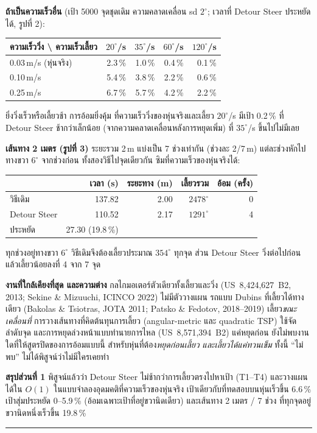 \documentclass[11pt,a4paper]{article}
\begin{document}
{\smallskip
\noindent\textbf{ถ้าเป็นความเร็วอื่น} (เป้า 5000 จุดชุดเดิม ความคลาดเคลื่อน sd $2^\circ$; เวลาที่ Detour Steer ประหยัดได้, รูปที่ 2):
\begin{center}
\begin{tabular}{lrrrr}
\toprule
ความเร็ววิ่ง \textbackslash{} ความเร็วเลี้ยว & $20^\circ$/s & $35^\circ$/s & $60^\circ$/s & $120^\circ$/s \\
\midrule
0.03\,m/s (หุ่นจริง) & 2.3\,\% & 1.0\,\% & 0.4\,\% & 0.1\,\% \\
0.10\,m/s            & 5.4\,\% & 3.8\,\% & 2.2\,\% & 0.6\,\% \\
0.25\,m/s            & 6.7\,\% & 5.7\,\% & 4.2\,\% & 2.2\,\% \\
\bottomrule
\end{tabular}
\end{center}
\noindent ยิ่งวิ่งเร็วหรือเลี้ยวช้า การอ้อมยิ่งคุ้ม ที่ความเร็ววิ่งของหุ่นจริงและเลี้ยว $20^\circ$/s
มีเป้า 0.2\,\% ที่ Detour Steer ช้ากว่าเล็กน้อย (จากความคลาดเคลื่อนหลังการหยุดเพิ่ม)
ที่ $35^\circ$/s ขึ้นไปไม่มีเลย

\smallskip
\noindent\textbf{เส้นทาง 2 เมตร (รูปที่ 3)} ระยะรวม 2\,m แบ่งเป็น 7 ช่วงเท่ากัน (ช่วงละ 2/7\,m)
แต่ละช่วงหักไปทางขวา $6^\circ$ จากช่วงก่อน ทั้งสองวิธีไปจุดเดียวกัน
ซิมที่ความเร็วของหุ่นจริงได้:
\begin{center}
\begin{tabular}{lrrrr}
\toprule
 & เวลา (s) & ระยะทาง (m) & เลี้ยวรวม & อ้อม (ครั้ง) \\
\midrule
วิธีเดิม       & 137.82 & 2.00 & $2478^\circ$ & 0 \\
Detour Steer & 110.52 & 2.17 & $1291^\circ$ & 4 \\
\midrule
ประหยัด       & 27.30 (19.8\,\%) & & & \\
\bottomrule
\end{tabular}
\end{center}
ทุกช่วงอยู่ทางขวา $6^\circ$ วิธีเดิมจึงต้องเลี้ยวประมาณ $354^\circ$ ทุกจุด ส่วน Detour Steer
วิ่งต่อไปก่อนแล้วเลี้ยวน้อยลงที่ 4 จาก 7 จุด

\medskip
\noindent\textbf{งานที่ใกล้เคียงที่สุด และความต่าง}
กลไกมอเตอร์ตัวเดียวทั้งเลี้ยวและวิ่ง (US~8,424,627~B2, 2013; Sekine \& Mizuuchi, ICINCO 2022) ไม่มีตัววางแผน
รถแบบ Dubins ที่เลี้ยวได้ทางเดียว (Bakolas \& Tsiotras, JOTA 2011; Patsko \& Fedotov, 2018--2019)
เลี้ยว\emph{ขณะเคลื่อนที่} การวางเส้นทางที่คิดต้นทุนการเลี้ยว (angular-metric และ quadratic TSP)
ใช้จัดลำดับจุด และการหยุดล่วงหน้าแบบทำนายการไหล (US~8,571,394~B2) แค่หยุดก่อน
ยังไม่พบงานใดที่ให้สูตรปิดของการอ้อมแบบนี้ สำหรับหุ่นที่ต้อง\emph{หยุดก่อนเลี้ยว และเลี้ยวได้แค่ทวนเข็ม}
ทั้งนี้ ``ไม่พบ'' ไม่ได้พิสูจน์ว่าไม่มีใครเคยทำ

\medskip
\noindent\textbf{สรุปส่วนที่ 1} พิสูจน์แล้วว่า Detour Steer ไม่ช้ากว่าการเลี้ยวตรงไปหาเป้า (T1--T4)
และวางแผนได้ใน $O(1)$ ในแบบจำลองอุดมคติที่ความเร็วของหุ่นจริง เป้าเดียวกับที่ทดสอบบนหุ่นเร็วขึ้น 6.6\,\%
เป้าสุ่มประหยัด 0--5.9\,\% (อ้อมเฉพาะเป้าที่อยู่ขวานิดเดียว) และเส้นทาง 2 เมตร / 7 ช่วง
ที่ทุกจุดอยู่ขวานิดหนึ่งเร็วขึ้น 19.8\,\%
}
\par\vspace{1mm}
\noindent\rule{\linewidth}{1.1pt}\par
\end{document}
